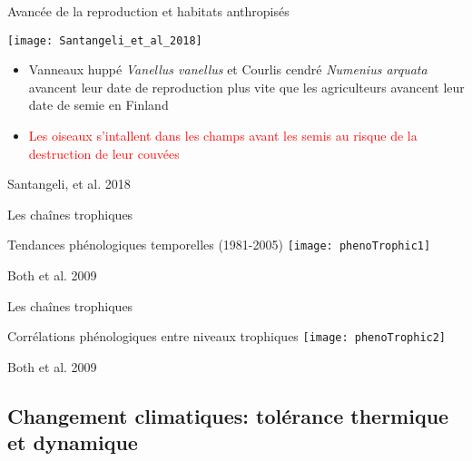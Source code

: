 \documentclass[10pt]{beamer}
\begin{document}
\begin{frame}{Avancée de la reproduction et habitats anthropisés}
    
  \begin{center}  
    \vspace{10pt}
    \texttt{[image: Santangeli\_et\_al\_2018]}
  \end{center}
  \begin{itemize}[<+->]
   \item  Vanneaux huppé \textit{Vanellus vanellus} et Courlis cendré \textit{Numenius arquata} avancent leur date de reproduction plus vite que les agriculteurs avancent leur date de semie en Finland
\item \textcolor{red}{Les oiseaux s'intallent dans les champs avant les semis au risque de la destruction de leur couvées}
  \end{itemize}

  \begin{tiny}
    Santangeli, et al. 2018

  \end{tiny}
\end{frame}





\begin{frame}{Les chaînes trophiques}
  \begin{center}
    Tendances phénologiques temporelles (1981-2005)
    \vspace{5pt}
    \texttt{[image: phenoTrophic1]}
  \end{center}
  \begin{tiny}
    Both et al. 2009
  \end{tiny}
\end{frame}

\begin{frame}{Les chaînes trophiques}
  \begin{center}
    Corrélations phénologiques entre niveaux trophiques
    \vspace{5pt}
    \texttt{[image: phenoTrophic2]}
  \end{center}
  \begin{tiny}
    Both et al. 2009
  \end{tiny}
\end{frame}



\subsection{Changement climatiques: tolérance thermique et dynamique}
\end{document}
